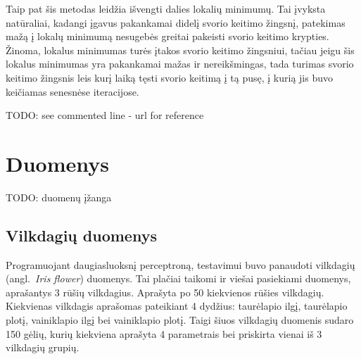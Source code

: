 \documentclass{VUMIFPSbakalaurinis}
\newcommand{\TODO}[1]{
\colorbox{todo-background-color}{TODO: #1}
}
\begin{document}
Taip pat šis metodas leidžia išvengti dalies lokalių minimumų.
Tai įvyksta natūraliai, kadangi įgavus pakankamai didelį svorio keitimo žingsnį, patekimas mažą į lokalų minimumą nesugebės greitai pakeisti svorio keitimo krypties.
Žinoma, lokalus minimumas turės įtakos svorio keitimo žingsniui, tačiau jeigu šis lokalus minimumas yra pakankamai mažas ir nereikšmingas, tada turimas svorio keitimo žingsnis leis kurį laiką tęsti svorio keitimą į tą pusę, į kurią jis buvo keičiamas senesnėse iteracijose.

\TODO{see commented line - url for reference}




\section{Duomenys}

\TODO{duomenų įžanga}


\subsection{Vilkdagių duomenys}

Programuojant daugiasluoksnį perceptroną, testavimui buvo panaudoti vilkdagių (angl.~\textit{Iris flower}) duomenys.
Tai plačiai taikomi ir viešai pasiekiami duomenys, aprašantys 3 rūšių vilkdagius.
Aprašyta po 50 kiekvienos rūšies vilkdagių.
Kiekvienas vilkdagis aprašomas pateikiant 4 dydžius: taurėlapio ilgį, taurėlapio plotį, vainiklapio ilgį bei vainiklapio plotį.
Taigi šiuos vilkdagių duomenis sudaro 150 gėlių, kurių kiekviena aprašyta 4 parametrais bei priskirta vienai iš 3 vilkdagių grupių.
\end{document}
